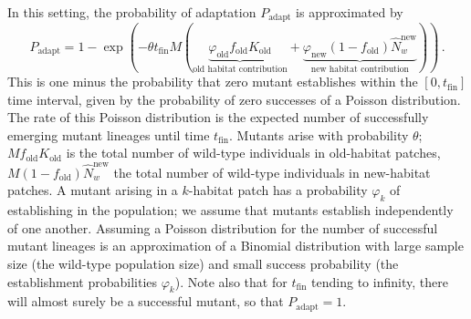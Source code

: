 \documentclass[11pt]{article}
\begin{document}
In this setting, the probability of adaptation $P_{\mathrm{adapt}}$ is approximated by
\begin{equation}\label{eq:source_sink}
	P_{\mathrm{adapt}} = 1 - \exp\left(-\theta t_{\text{fin}} M \left(\underbrace{\varphi_{\text{old}} f_{\text{old}} K_{\text{old}}}_{\text{old habitat contribution}} + \underbrace{\varphi_{\text{new}} (1-f_{\text{old}}) \widehat{N}_w^{\text{new}}}_{\text{new habitat contribution}}\right)\right)\, .	
\end{equation}
This is one minus the probability that zero mutant establishes within the $[0, t_{\text{fin}}]$ time interval, given by the probability of zero successes of a Poisson distribution. The rate of this Poisson distribution is the expected number of successfully emerging mutant lineages until time $t_{\text{fin}}$. Mutants arise with probability $\theta$; $M f_{\text{old}} K_{\text{old}}$ is the total number of wild-type individuals in old-habitat patches, $M (1 - f_{\text{old}}) \widehat{N}_w^{\text{new}}$ the total number of wild-type individuals in new-habitat patches. A mutant arising in a $k$-habitat patch has a probability $\varphi_{k}$ of establishing in the population; we assume that mutants establish independently of one another. 
 Assuming a Poisson distribution for the number of successful mutant lineages is an approximation of a Binomial distribution with large sample size (the wild-type population size) and small success probability (the establishment probabilities $\varphi_{k}$). 
Note also that for $t_{\text{fin}}$ tending to infinity, there will almost surely be a successful mutant, so that $P_{\text{adapt}}=1$. 
\end{document}
